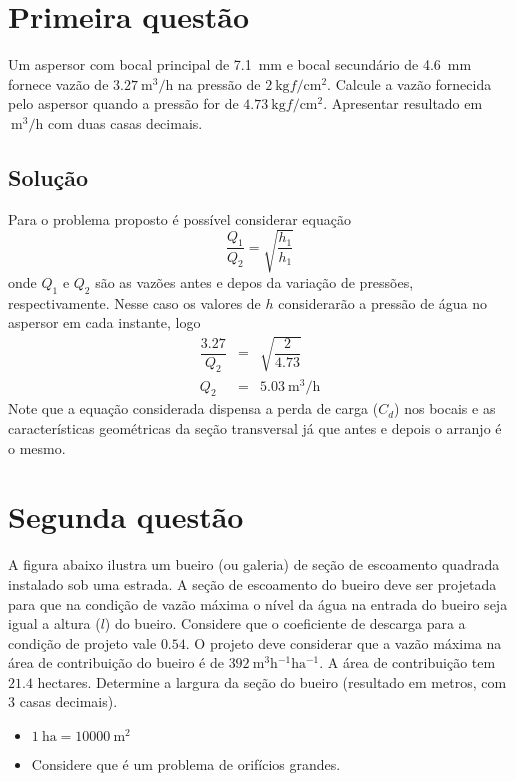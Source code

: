 \documentclass[a4paper, 12pt, brazilian]{article}
\numberwithin{equation}{section}
\begin{document}
	\section{Primeira questão}
	Um aspersor com bocal principal de \SI{7.1}{\milli\meter} e bocal secundário de \SI{4.6}{\milli\meter} fornece vazão de $\SI{3.27}{\meter^{3}/\hour}$ na pressão de $\SI{2}{\kilogram f/\centi\meter^{2}}$. Calcule a vazão fornecida pelo aspersor quando a pressão for de $\SI{4.73}{\kilogram f/\centi\meter^{2}}$. Apresentar resultado em $\SI{}{\meter^{3}/\hour}$ com duas casas decimais.
	\subsection{Solução}
	Para o problema proposto é possível considerar equação
	\begin{equation}
		\dfrac{Q_{1}}{Q_{2}}=\sqrt{\dfrac{h_{1}}{h_{1}}}
	\end{equation}
	onde $Q_{1}$ e $Q_{2}$ são as vazões antes e depos da variação de pressões, respectivamente. Nesse caso os valores de $h$ considerarão a pressão de água no aspersor em cada instante, logo
	\begin{eqnarray}
		\dfrac{3.27}{Q_{2}}&=&\sqrt{\dfrac{2}{4.73}}\\
		Q_{2}&=&\SI{5.03}{\meter^{3}/\hour}
	\end{eqnarray}
	Note que a equação considerada dispensa a perda de carga ($C_{d}$) nos bocais e as características geométricas da seção transversal já que antes e depois o arranjo é o mesmo.
	\section{Segunda questão}
	A figura abaixo ilustra um bueiro (ou galeria) de seção de escoamento quadrada instalado sob uma estrada. A seção de escoamento do bueiro deve ser projetada para que na condição de vazão máxima o nível da água na entrada do bueiro seja igual a altura ($l$) do bueiro. Considere que o coeficiente de descarga para a condição de projeto vale $0.54$. O projeto deve considerar que a vazão máxima na área de contribuição do bueiro é de $\SI{392}{\meter^{3}\hour^{-1}\hectare^{-1}}$. A área de contribuição tem $21.4$ hectares. Determine a largura da seção do bueiro (resultado em metros, com 3 casas decimais).
	\begin{itemize}
		\item$\SI{1}{\hectare}=\SI{10000}{\meter^{2}}$
		\item Considere que é um problema de orifícios grandes.
	\end{itemize}
\end{document}

